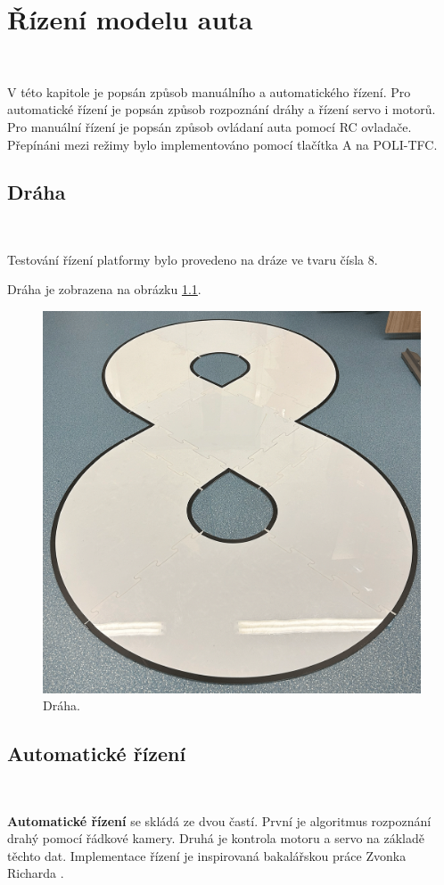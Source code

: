 \chapter{Řízení modelu auta}
\label{sec:PlatformControl}\

V této kapitole je popsán způsob manuálního a automatického řízení. Pro automatické
řízení je popsán způsob rozpoznání dráhy a řízení servo i motorů. Pro manuální
řízení je popsán způsob ovládaní auta pomocí RC ovladače. Přepínáni mezi režimy
bylo implementováno pomocí tlačítka A na POLI-TFC.

\section{Dráha}\

Testování řízení platformy bylo provedeno na dráze ve tvaru čísla 8.

Dráha je zobrazena na obrázku \ref{fig:Road}.

\begin{figure}[!h]
    \centering
    \includegraphics[width = .55\linewidth]{Figures/Road.png}
    \caption{Dráha.}
    \label{fig:Road}
    \vspace{-15pt}
\end{figure}

\section{Automatické řízení}\

\textbf{Automatické řízení} se skládá ze dvou častí. První je algoritmus rozpoznání drahý pomocí řádkové kamery. Druhá je kontrola motoru a servo na základě těchto dat. Implementace řízení je inspirovaná bakalářskou práce Zvonka Richarda .

